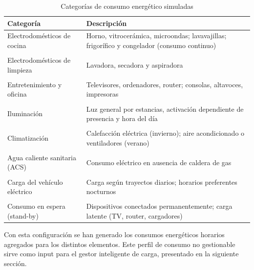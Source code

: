 \begin{table}[H]
\centering
    \begin{tabular}{@{}p{3.4cm} p{10.6cm}@{}}
        \toprule
        \textbf{Categoría} & \textbf{Descripción} \\
        \midrule
        Electrodomésticos de cocina &
        Horno, vitrocerámica, microondas; lavavajillas; frigorífico y congelador (consumo continuo) \\
        \\[-1.5ex]
        Electrodomésticos de limpieza & Lavadora, secadora y aspiradora \\
        \\[-1.5ex]
        Entretenimiento y oficina &
        Televisores, ordenadores, router; consolas, altavoces, impresoras \\
        \\[-1.5ex]
        Iluminación &
        Luz general por estancias, activación dependiente de presencia y hora del día \\
        \\[-1.5ex]
        Climatización &
        Calefacción eléctrica (invierno); aire acondicionado o ventiladores (verano) \\
        \\[-1.5ex]
        Agua caliente sanitaria (ACS) &
        Consumo eléctrico en ausencia de caldera de gas \\
        \\[-1.5ex]
        Carga del vehículo eléctrico &
        Carga según trayectos diarios; horarios preferentes nocturnos \\
        \\[-1.5ex]
        Consumo en espera (stand-by) &
        Dispositivos conectados permanentemente; carga latente (TV, router, cargadores)\\
        \bottomrule
    \end{tabular}
\caption{Categorías de consumo energético simuladas}
\end{table}
Con esta configuración se han generado los consumos energéticos horarios agregados para los 
distintos elementos. Este perfil de consumo no gestionable sirve como input para el gestor 
inteligente de carga, presentado en la siguiente sección.


